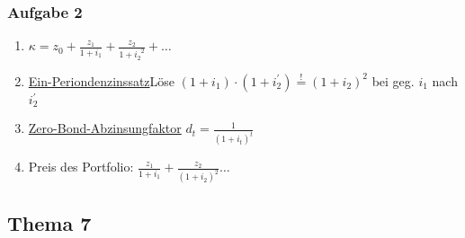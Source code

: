 	\subsubsection*{Aufgabe 2}
	\begin{enumerate}[label=\alph*)]
		\item $\kappa= z_0 + \frac{z_1}{1+i_1} + \frac{z_2}{{1+i_2}^2} + \dots$
		\item \hyperref[EinPeriodenzinssatz]{Ein-Periondenzinssatz}Löse $(1+i_1)\cdot (1+i_2^\prime)  \overset{!}{=} (1+i_2)^2$ bei geg. $i_1$ nach $i_2^\prime$
		\item \hyperref[ZeroBondAbzinsungsfaktor]{Zero-Bond-Abzinsungfaktor} $d_t=\frac{1}{(1+i_t)^t}$
		\item Preis des Portfolio: $\frac{z_1}{1+i_1}+\frac{z_2}{(1+i_2)^2} \dots$ 
	\end{enumerate}

	\subsection*{Thema 7}
